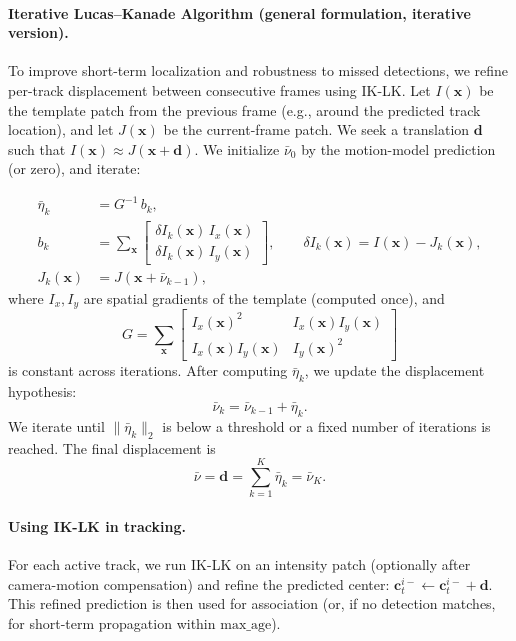 \paragraph{Iterative Lucas--Kanade Algorithm (general formulation, iterative version).}
To improve short-term localization and robustness to missed detections, we refine per-track displacement between consecutive frames using IK-LK.
Let $I(\mathbf{x})$ be the template patch from the previous frame (e.g., around the predicted track location),
and let $J(\mathbf{x})$ be the current-frame patch. We seek a translation $\mathbf{d}$ such that
$I(\mathbf{x}) \approx J(\mathbf{x}+\mathbf{d})$.
We initialize $\bar{\nu}_0$ by the motion-model prediction (or zero), and iterate:

\begin{align}
\bar{\eta}_k &= G^{-1}\,b_k,\\
b_k &= \sum_{\mathbf{x}}\begin{bmatrix}
\delta I_k(\mathbf{x})\,I_x(\mathbf{x})\\
\delta I_k(\mathbf{x})\,I_y(\mathbf{x})
\end{bmatrix},\qquad
\delta I_k(\mathbf{x}) = I(\mathbf{x}) - J_k(\mathbf{x}),\\
J_k(\mathbf{x}) &= J(\mathbf{x}+\bar{\nu}_{k-1}),
\end{align}
where $I_x,I_y$ are spatial gradients of the template (computed once), and
\begin{equation}
G=\sum_{\mathbf{x}}
\begin{bmatrix}
I_x(\mathbf{x})^2 & I_x(\mathbf{x})I_y(\mathbf{x})\\
I_x(\mathbf{x})I_y(\mathbf{x}) & I_y(\mathbf{x})^2
\end{bmatrix}
\end{equation}
is constant across iterations. After computing $\bar{\eta}_k$, we update the displacement hypothesis:
\begin{equation}
\bar{\nu}_k=\bar{\nu}_{k-1}+\bar{\eta}_k.
\end{equation}
We iterate until $\|\bar{\eta}_k\|_2$ is below a threshold or a fixed number of iterations is reached. The final displacement is
\begin{equation}
\bar{\nu}=\mathbf{d}=\sum_{k=1}^{K}\bar{\eta}_k=\bar{\nu}_K.
\end{equation}

\paragraph{Using IK-LK in tracking.}
For each active track, we run IK-LK on an intensity patch (optionally after camera-motion compensation) and refine the predicted center:
$\mathbf{c}^{i-}_t \leftarrow \mathbf{c}^{i-}_t + \mathbf{d}$.
This refined prediction is then used for association (or, if no detection matches, for short-term propagation within $\text{max\_age}$).